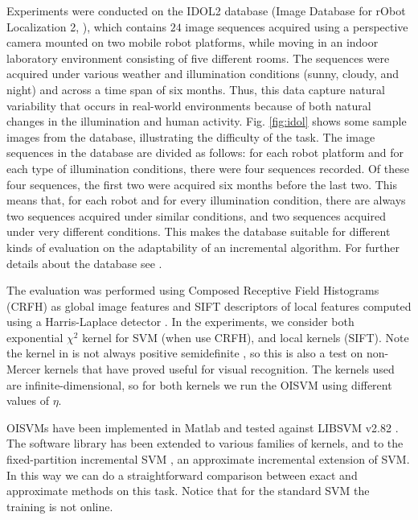 Experiments were conducted on the IDOL2 database
(Image Database for rObot Localization 2, \cite{luo:idol2}), which
contains $24$ image sequences acquired using a perspective camera
mounted on two mobile robot platforms, while moving in an indoor
laboratory environment consisting of five different rooms.
The sequences were acquired under various
weather and illumination conditions (sunny, cloudy, and night) and
across a time span of six months. Thus, this data capture natural
variability that occurs in real-world environments because of both
natural changes in the illumination and human activity.
Fig. \ref{fig:idol} shows some sample images from the database,
illustrating the difficulty of the task.  The image sequences in the
database are divided as follows: for each robot platform and for each
type of illumination conditions, there were four sequences
recorded. Of these four sequences, the first two were acquired six
months before the last two. This means that, for each robot and for
every illumination condition, there are always two sequences acquired
under similar conditions, and two sequences acquired under very
different conditions. This makes the database suitable for different
kinds of evaluation on the adaptability of an incremental
algorithm. For further details about the database see \cite{luo:idol2}.

The evaluation was performed using Composed Receptive Field Histograms
(CRFH) \cite{linde:icpr04} as global image features and SIFT descriptors
\cite{lowe99object} of local features computed using a
Harris-Laplace detector \cite{HarrisS88}. In the experiments,
we consider both exponential $\chi^2$ kernel for SVM (when use CRFH),
and local kernels \cite{wallraven:iccv03} (SIFT). Note the kernel in
\cite{wallraven:iccv03} is not always positive semidefinite
\cite{fleuret:bmvc04}, so this is also a test on non-Mercer
kernels that have proved useful for visual recognition.
The kernels used are infinite-dimensional, so for both
kernels we run the OISVM using different values of $\eta$.

OISVMs have been implemented in Matlab and tested against LIBSVM v2.82
\cite{ChangL01}. The software library has been extended to various
families of kernels, and to the fixed-partition incremental SVM \cite{syed99incremental},
an approximate incremental extension of SVM.
In this way we can do a straightforward comparison
between exact and approximate methods
on this task.
Notice that for the standard SVM the training is not online.

